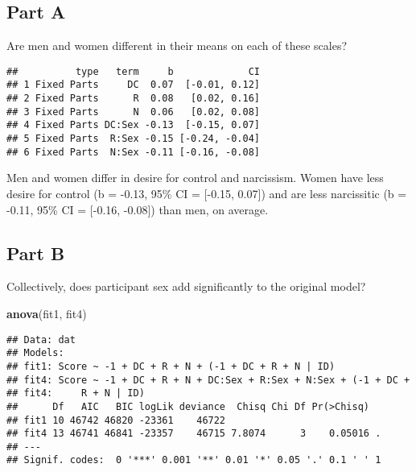 \documentclass[]{article}
\newenvironment{Shaded}{\begin{snugshade}}{\end{snugshade}}
\newcommand{\KeywordTok}[1]{\textcolor[rgb]{0.13,0.29,0.53}{\textbf{#1}}}
\newcommand{\StringTok}[1]{\textcolor[rgb]{0.31,0.60,0.02}{#1}}
\newcommand{\OperatorTok}[1]{\textcolor[rgb]{0.81,0.36,0.00}{\textbf{#1}}}
\newcommand{\NormalTok}[1]{#1}
\begin{document}
\subsection{Part A}\label{part-a-1}

Are men and women different in their means on each of these scales?

\begin{Shaded}
\end{Shaded}

\begin{verbatim}
##          type   term     b             CI
## 1 Fixed Parts     DC  0.07  [-0.01, 0.12]
## 2 Fixed Parts      R  0.08   [0.02, 0.16]
## 3 Fixed Parts      N  0.06   [0.02, 0.08]
## 4 Fixed Parts DC:Sex -0.13  [-0.15, 0.07]
## 5 Fixed Parts  R:Sex -0.15 [-0.24, -0.04]
## 6 Fixed Parts  N:Sex -0.11 [-0.16, -0.08]
\end{verbatim}

Men and women differ in desire for control and narcissism. Women have
less desire for control (b = -0.13, 95\% CI = {[}-0.15, 0.07{]}) and are
less narcissitic (b = -0.11, 95\% CI = {[}-0.16, -0.08{]}) than men, on
average.

\subsection{Part B}\label{part-b-1}

Collectively, does participant sex add significantly to the original
model?

\begin{Shaded}
\begin{Highlighting}[]
\KeywordTok{anova}\NormalTok{(fit1, fit4)}
\end{Highlighting}
\end{Shaded}

\begin{verbatim}
## Data: dat
## Models:
## fit1: Score ~ -1 + DC + R + N + (-1 + DC + R + N | ID)
## fit4: Score ~ -1 + DC + R + N + DC:Sex + R:Sex + N:Sex + (-1 + DC + 
## fit4:     R + N | ID)
##      Df   AIC   BIC logLik deviance  Chisq Chi Df Pr(>Chisq)  
## fit1 10 46742 46820 -23361    46722                           
## fit4 13 46741 46841 -23357    46715 7.8074      3    0.05016 .
## ---
## Signif. codes:  0 '***' 0.001 '**' 0.01 '*' 0.05 '.' 0.1 ' ' 1
\end{verbatim}
\end{document}

